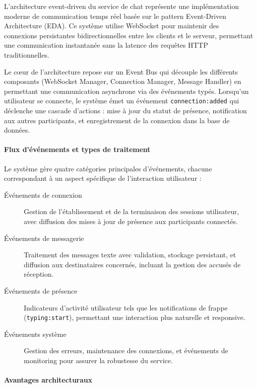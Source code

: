 \documentclass{rapportPfe}
\begin{document}
L'architecture event-driven du service de chat représente une implémentation moderne de communication temps réel basée sur le pattern Event-Driven Architecture (EDA). Ce système utilise WebSocket pour maintenir des connexions persistantes bidirectionnelles entre les clients et le serveur, permettant une communication instantanée sans la latence des requêtes HTTP traditionnelles. 

Le cœur de l'architecture repose sur un Event Bus qui découple les différents composants (WebSocket Manager, Connection Manager, Message Handler) en permettant une communication asynchrone via des événements typés. Lorsqu'un utilisateur se connecte, le système émet un événement \texttt{connection:added} qui déclenche une cascade d'actions : mise à jour du statut de présence, notification aux autres participants, et enregistrement de la connexion dans la base de données.

\paragraph{Flux d'événements et types de traitement}

Le système gère quatre catégories principales d'événements, chacune correspondant à un aspect spécifique de l'interaction utilisateur :

\begin{description}
    \item[Événements de connexion] Gestion de l'établissement et de la terminaison des sessions utilisateur, avec diffusion des mises à jour de présence aux participants connectés.
    
    \item[Événements de messagerie] Traitement des messages texte avec validation, stockage persistant, et diffusion aux destinataires concernés, incluant la gestion des accusés de réception.
    
    \item[Événements de présence] Indicateurs d'activité utilisateur tels que les notifications de frappe (\texttt{typing:start}), permettant une interaction plus naturelle et responsive.
    
    \item[Événements système] Gestion des erreurs, maintenance des connexions, et événements de monitoring pour assurer la robustesse du service.
\end{description}

\paragraph{Avantages architecturaux}
\end{document}
